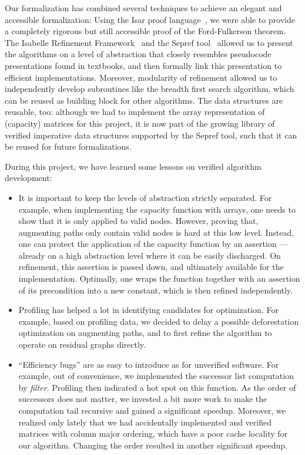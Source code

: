 \documentclass[smallcondensed]{svjour3}     %
\begin{document}
  Our formalization has combined several techniques to achieve an elegant and accessible formalization: 
  Using the Isar proof language~\cite{Wenzel99}, we were able to provide a completely rigorous but 
  still accessible proof of the Ford-Fulkerson theorem. The Isabelle Refinement Framework~\cite{LaTu12,La12} and the Sepref tool~\cite{La15,La16}
  allowed us to present the algorithms on a level 
  of abstraction that closely resembles pseudocode presentations found in textbooks, and then formally link this presentation to efficient
  implementations. Moreover, modularity of refinement allowed us to independently develop subroutines like the breadth first search algorithm, 
  which can be reused as building block for other algorithms.
  The data structures are reusable, too: although we had to implement the array representation of (capacity) matrices for this project, it is now part of the 
  growing library of verified imperative data structures supported by the Sepref tool, such that it can be reused for future formalizations.
  
  During this project, we have learned some lessons on verified algorithm development: 
  \begin{itemize}
  \item It is important to keep the levels of abstraction strictly separated.
    For example, when implementing the capacity function with arrays, one needs to show that it is only applied to valid nodes.
    However, proving that, \eg augmenting paths only contain valid nodes is hard at this low level. 
    Instead, one can protect the application of the capacity function by an assertion --- already on a high abstraction level where it can be easily discharged. 
    On refinement, this assertion is passed down, and ultimately available for the implementation.
    Optimally, one wraps the function together with an assertion of its precondition into a new constant, which is then refined independently.
  \item Profiling has helped a lot in identifying candidates for optimization. For example, based on profiling data, we decided to delay a 
    possible deforestation optimization on augmenting paths, and to first refine the algorithm to operate on residual graphs directly.
  \item ``Efficiency bugs'' are as easy to introduce as for unverified software. For example, out of convenience, we implemented the successor list computation by
    \emph{filter}. Profiling then indicated a hot spot on this function. As the order of successors does not matter, we invested a bit more work to make the computation tail 
    recursive and gained a significant speedup. Moreover, we realized only lately that we had accidentally implemented and verified
    matrices with column major ordering, which have a poor cache locality for our algorithm. Changing the order resulted in another significant speedup.
  \end{itemize}
  
\end{document}
